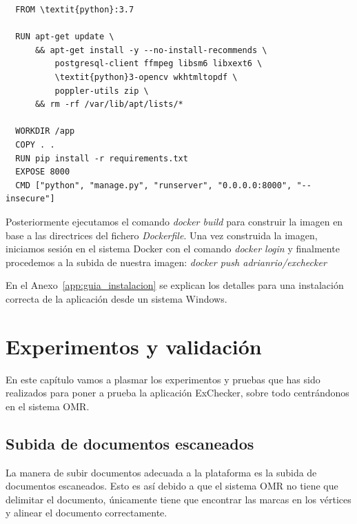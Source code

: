 \documentclass[a4paper, 12pt]{book}
\begin{document}
{\footnotesize
\begin{verbatim}
  FROM \textit{python}:3.7

  RUN apt-get update \
      && apt-get install -y --no-install-recommends \
          postgresql-client ffmpeg libsm6 libxext6 \
          \textit{python}3-opencv wkhtmltopdf \
          poppler-utils zip \
      && rm -rf /var/lib/apt/lists/*
  
  WORKDIR /app
  COPY . .
  RUN pip install -r requirements.txt
  EXPOSE 8000
  CMD ["python", "manage.py", "runserver", "0.0.0.0:8000", "--insecure"]
\end{verbatim}
}

Posteriormente ejecutamos el comando \textit{docker build} para construir la imagen
en base a las directrices del fichero \textit{Dockerfile}. Una vez construida la imagen,
iniciamos sesión en el sistema Docker con el comando \textit{docker login} y finalmente
procedemos a la subida de nuestra imagen: \textit{docker push adrianrio/exchecker}

En el Anexo~\ref{app:guia_instalacion} se explican los detalles para una instalación
correcta de la aplicación desde un sistema Windows.



\cleardoublepage
\chapter{Experimentos y validación}

En este capítulo vamos a plasmar los experimentos y pruebas que has sido
realizados para poner a prueba la aplicación ExChecker, sobre todo
centrándonos en el sistema OMR.

\section{Subida de documentos escaneados}
\label{sec:doc_escaneados}

La manera de subir documentos adecuada a la plataforma es la subida de
documentos escaneados. Esto es así debido a que el sistema OMR no
tiene que delimitar el documento, únicamente tiene que encontrar las
marcas en los vértices y alinear el documento correctamente.
\end{document}
